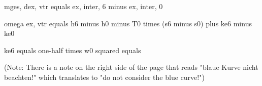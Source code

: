 mges, dex, vtr equals ex, inter, 6 minus ex, inter, 0

omega ex, vtr equals h6 minus h0 minus T0 times (s6 minus s0) plus ke6 minus ke0

ke6 equals one-half times w0 squared equals

(Note: There is a note on the right side of the page that reads "blaue Kurve nicht beachten!" which translates to "do not consider the blue curve!")